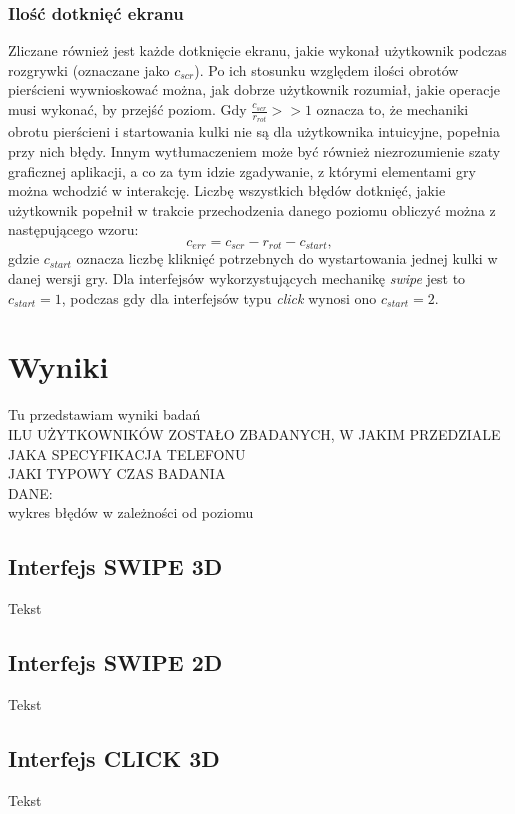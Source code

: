 \documentclass[a4paper,12pt,numbers=noenddot]{report}
\begin{document}
	\subsection{Ilość dotknięć ekranu}
Zliczane również jest każde dotknięcie ekranu, jakie wykonał użytkownik podczas rozgrywki (oznaczane jako $c_{scr}$). Po ich stosunku względem ilości obrotów pierścieni wywnioskować można, jak dobrze użytkownik rozumiał, jakie operacje musi wykonać, by przejść poziom. Gdy $\frac{c_{scr}}{r_{rot}} >> 1$ oznacza to, że mechaniki obrotu pierścieni i startowania kulki nie są dla użytkownika intuicyjne, popełnia przy nich błędy. Innym wytłumaczeniem może być również niezrozumienie szaty graficznej aplikacji, a co za tym idzie zgadywanie, z którymi elementami gry można wchodzić w interakcję. Liczbę wszystkich błędów dotknięć, jakie użytkownik popełnił w trakcie przechodzenia danego poziomu obliczyć można z następującego wzoru:
\begin{equation}
c_{err} = c_{scr} - r_{rot} - c_{start},
\end{equation}
gdzie  $c_{start}$ oznacza liczbę kliknięć potrzebnych do wystartowania jednej kulki w danej wersji gry. Dla interfejsów wykorzystujących mechanikę \textit{swipe} jest to $c_{start} = 1$, podczas gdy dla interfejsów typu \textit{click} wynosi ono $c_{start} = 2$.
\chapter{Wyniki}
Tu przedstawiam wyniki badań\\

ILU UŻYTKOWNIKÓW ZOSTAŁO ZBADANYCH, W JAKIM PRZEDZIALE\\
JAKA SPECYFIKACJA TELEFONU \\
JAKI TYPOWY CZAS BADANIA \\

DANE:\\
wykres błędów w zależności od poziomu\\



\section{Interfejs SWIPE 3D}
Tekst
\section{Interfejs SWIPE 2D}
Tekst
\section{Interfejs CLICK 3D}
Tekst
\end{document}
